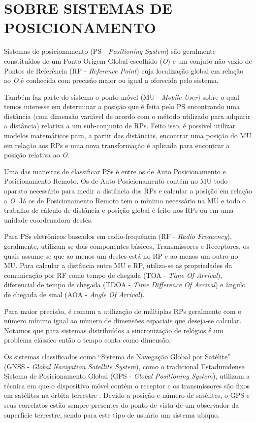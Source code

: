 \documentclass[
	12pt,				%
	openright,			%
	oneside,			%
	a4paper,			%
	chapter=TITLE,		%
	english,			%
	french,				%
	spanish,			%
	brazil				%
	]{abntex2}
\begin{document}
{\section{SOBRE SISTEMAS DE POSICIONAMENTO}
\label{sec:SOBRE SISTEMAS DE POSICIONAMENTO}

Sistemas de posicionamento (PS - \textit{Positioning System}) são geralmente
constituídos de um Ponto Origem Global escolhido (\textit{O}) e um conjuto não
vazio de Pontos de Referência (RP - \textit{Reference Point}) cuja localização
global em relação ao \textit{O} é conhecida com precisão maior ou igual a
oferecida pelo sistema.

Também faz parte do sistema o ponto móvel (MU - \textit{Mobile User}) sobre o
qual temos interesse em determinar a posição que é feita pelo PS encontrando uma
distância (com dimensão variável de acordo com o método utilizado para
adquirir a distância) relativa a um sub-conjunto de RPs. Feito isso, é possível utilizar
modelos matemáticos para, a partir das distâncias, encontrar uma posição do MU
em relação aos RPs e uma nova transformação é aplicada para encontrar a posição
relativa ao \textit{O}.

Uma das maneiras de classificar PSs é entre os de Auto Posicionamento e
Posicionamento Remoto. Os de Auto Posicionamento contém no MU todo aparato
necessário para medir a distância dos RPs e calcular a posição em relação a
\textit{O}. Já os de Posicionamento Remoto tem o mínimo necessário na MU e todo
o trabalho de cálculo de distância e posição global é feito nos RPs ou em uma
unidade coordenadora destes.

Para PSs eletrônicos baseados em radio-frequência (RF - \textit{Radio
Frequency}), geralmente, utilizam-se dois componentes básicos, Transmissores e
Receptores, os quais assume-se que ao menos um destes está no RP e ao menos um
outro no MU. Para calcular a distância entre MU e RP, utiliza-se as propriedades
da comunicação por RF como tempo de chegada (TOA - \textit{Time Of Arrival}),
diferencial de tempo de chegada (TDOA - \textit{Time Difference Of Arrival}) e
ângulo de chegada de sinal (AOA - \textit{Angle Of Arrival}).

Para maior precisão, é comum a utilização de múltiplas RPs geralmente com o
número mínimo igual ao número de dimensões espaciais que deseja-se calcular.
Notamos que para sistemas distribuídos a sincronização de relógios é um problema
clássico então o tempo conta como dimensão.

Os sistemas classificados como ``Sistema de Navegação Global por Satélite''
(GNSS - \textit{Global Navigation Satellite System}), como o tradicional
Estadunidense Sistema de Posicionamento Global (GPS - \textit{Global Positioning
System}), utilizam a técnica em que o dispositivo móvel contém o receptor e os
transmissores são fixos em satélites na órbita terrestre \cite{Djuknic2001}.
Devido a posição e número de satélites, o GPS e seus correlatos estão sempre
presentes do ponto de vista de um observador da superfície terrestre, sendo para
este tipo de usuário um sistema ubíquo.

}
\end{document}
